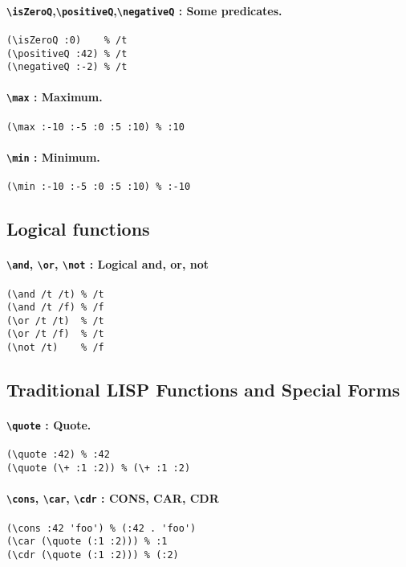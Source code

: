\documentclass[10pt,a4paper]{article}
\newcommand{\pT}[1]{\textbf{\texttt{\textbackslash #1}}}
\begin{document}
\paragraph{\pT{isZeroQ},\pT{positiveQ},\pT{negativeQ} : Some predicates.}
\begin{verbatim}
(\isZeroQ :0)    % /t
(\positiveQ :42) % /t
(\negativeQ :-2) % /t
\end{verbatim}

\paragraph{\pT{max} : Maximum.}
\begin{verbatim}
(\max :-10 :-5 :0 :5 :10) % :10
\end{verbatim}

\paragraph{\pT{min} : Minimum.}
\begin{verbatim}
(\min :-10 :-5 :0 :5 :10) % :-10
\end{verbatim}


\subsection{Logical functions}

\paragraph{\pT{and}, \pT{or}, \pT{not} : Logical and, or, not}
\begin{verbatim}
(\and /t /t) % /t
(\and /t /f) % /f
(\or /t /t)  % /t
(\or /t /f)  % /t
(\not /t)    % /f
\end{verbatim}


\subsection{Traditional LISP Functions and Special Forms}

\paragraph{\pT{quote} : Quote.}
\begin{verbatim}
(\quote :42) % :42
(\quote (\+ :1 :2)) % (\+ :1 :2)
\end{verbatim}

\paragraph{\pT{cons}, \pT{car}, \pT{cdr} : CONS, CAR, CDR}
\begin{verbatim}
(\cons :42 'foo') % (:42 . 'foo')
(\car (\quote (:1 :2))) % :1
(\cdr (\quote (:1 :2))) % (:2)
\end{verbatim}
\end{document}
